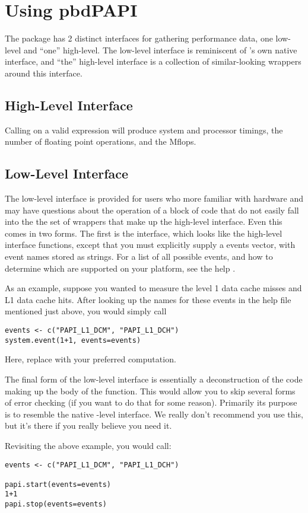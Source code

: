 \section{Using pbdPAPI}

The \thispackage package has 2 distinct interfaces for gathering performance data, one low-level 
and ``one'' high-level.  The low-level interface is reminiscent of \PAPI's own native \C interface, 
and ``the'' high-level interface is a collection of similar-looking wrappers around this interface.


\subsection{High-Level Interface}

Calling  on a valid \R expression  will  
produce system and processor timings, the number of floating point operations, 
and the Mflops.


\subsection{Low-Level Interface}

The low-level interface is provided for users who more familiar with hardware and may have 
questions about the operation of a block of code that do not easily fall into the the set of 
wrappers that make up the high-level interface.  Even this comes in two forms.  The first is the 
 interface, which looks like the high-level interface functions, except that 
you must explicitly supply a \PAPI events vector, with event names stored as strings.  For a list 
of all possible events, and how to determine which are supported on your platform, see the \R help 
.

As an example, suppose you wanted to measure the level 1 data cache misses and L1 data cache hits. 
After looking up the names for these events in the help file mentioned just above, you would simply 
call
\begin{lstlisting}[language=rr]
events <- c("PAPI_L1_DCM", "PAPI_L1_DCH")
system.event(1+1, events=events)
\end{lstlisting}

Here, replace  with your preferred computation.

The final form of the low-level interface is essentially a deconstruction of the code making up the 
body of the  function.  This would allow you to skip several forms of error 
checking (if you want to do that for some reason).  Primarily its purpose is to resemble the 
native \C-level \PAPI interface.  We really don't recommend you use this, but it's there if you 
really believe you need it.

Revisiting the above example, you would call:
\begin{lstlisting}[language=rr]
events <- c("PAPI_L1_DCM", "PAPI_L1_DCH")

papi.start(events=events)
1+1
papi.stop(events=events)
\end{lstlisting}